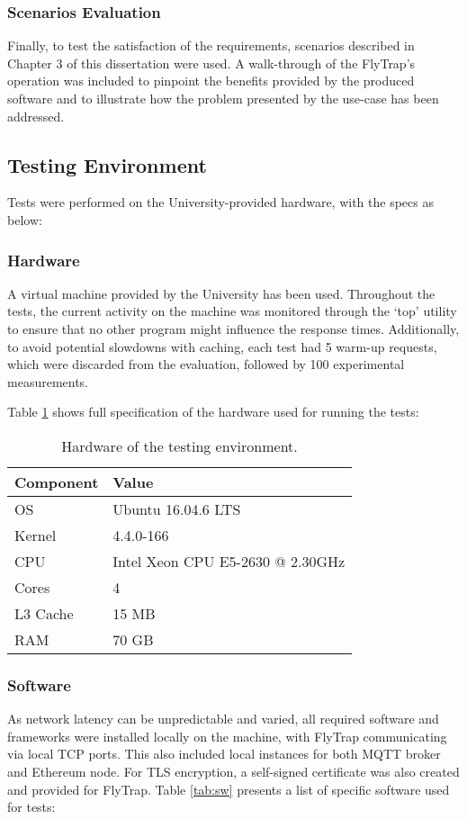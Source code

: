 \subsubsection{Scenarios Evaluation}
Finally, to test the satisfaction of the requirements, scenarios described in Chapter 3 of this dissertation were used. A walk-through of the FlyTrap's operation was included to pinpoint the benefits provided by the produced software and to illustrate how the problem presented by the use-case has been addressed.

\subsection{Testing Environment}
Tests were performed on the University-provided hardware, with the specs as below:
\subsubsection{Hardware}
A virtual machine provided by the University has been used. Throughout the tests, the current activity on the machine was monitored through the `top' utility to ensure that no other program might influence the response times. Additionally, to avoid potential slowdowns with caching, each test had 5 warm-up requests, which were discarded from the evaluation, followed by 100 experimental measurements.

Table \ref{tab:hw} shows full specification of the hardware used for running the tests:
\begin{table}[h]
\centering
\begin{tabular}{|l|l|}
\hline
\textbf{Component} & \textbf{Value}                   \\ \hline
OS                 & Ubuntu 16.04.6 LTS               \\ \hline
Kernel             & 4.4.0-166                        \\ \hline
CPU                & Intel Xeon CPU E5-2630 @ 2.30GHz \\ \hline
Cores              & 4                                \\ \hline
L3 Cache           & 15 MB                            \\ \hline
RAM                & 70 GB                            \\ \hline
\end{tabular}
\caption{Hardware of the testing environment.}
\label{tab:hw}
\end{table}
\subsubsection{Software}
As network latency can be unpredictable and varied, all required software and frameworks were installed locally on the machine, with FlyTrap communicating via local TCP ports. This also included local instances for both MQTT broker and Ethereum node. For TLS encryption, a self-signed certificate was also created and provided for FlyTrap. Table \ref{tab:sw} presents a list of specific software used for tests:

